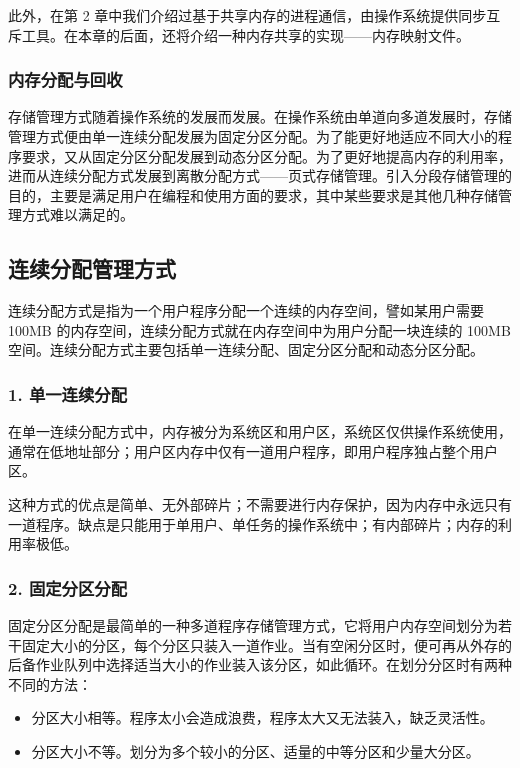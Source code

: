 \documentclass{ctexbook}
\begin{document}
	此外，在第 2 章中我们介绍过基于共享内存的进程通信，由操作系统提供同步互斥工具。在本章的后面，还将介绍一种内存共享的实现——内存映射文件。
	
	\subsubsection{内存分配与回收}
	存储管理方式随着操作系统的发展而发展。在操作系统由单道向多道发展时，存储管理方式便由单一连续分配发展为固定分区分配。为了能更好地适应不同大小的程序要求，又从固定分区分配发展到动态分区分配。为了更好地提高内存的利用率，进而从连续分配方式发展到离散分配方式——页式存储管理。引入分段存储管理的目的，主要是满足用户在编程和使用方面的要求，其中某些要求是其他几种存储管理方式难以满足的。
	
	\subsection{连续分配管理方式}
	连续分配方式是指为一个用户程序分配一个连续的内存空间，譬如某用户需要 100MB 的内存空间，连续分配方式就在内存空间中为用户分配一块连续的 100MB 空间。连续分配方式主要包括单一连续分配、固定分区分配和动态分区分配。
	
	\subsubsection{1. 单一连续分配}
	在单一连续分配方式中，内存被分为系统区和用户区，系统区仅供操作系统使用，通常在低地址部分；用户区内存中仅有一道用户程序，即用户程序独占整个用户区。
	
	这种方式的优点是简单、无外部碎片；不需要进行内存保护，因为内存中永远只有一道程序。缺点是只能用于单用户、单任务的操作系统中；有内部碎片；内存的利用率极低。
	
	\subsubsection{2. 固定分区分配}
	固定分区分配是最简单的一种多道程序存储管理方式，它将用户内存空间划分为若干固定大小的分区，每个分区只装入一道作业。当有空闲分区时，便可再从外存的后备作业队列中选择适当大小的作业装入该分区，如此循环。在划分分区时有两种不同的方法：
	\begin{itemize}
		\item 分区大小相等。程序太小会造成浪费，程序太大又无法装入，缺乏灵活性。
		\item 分区大小不等。划分为多个较小的分区、适量的中等分区和少量大分区。
	\end{itemize}
	
\end{document}
